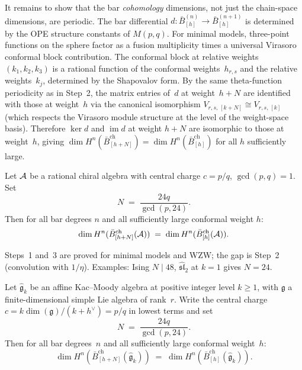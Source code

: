 \begin{evidence}
It remains to show that the bar \emph{cohomology} dimensions, not just the
chain-space dimensions, are periodic.  The bar differential
$d \colon \bar{B}^{(n)}_{[h]} \to \bar{B}^{(n+1)}_{[h]}$ is determined by the
OPE structure constants of $M(p,q)$.  For minimal models, three-point functions
on the sphere factor as a fusion multiplicity times a universal Virasoro
conformal block contribution.  The conformal block at relative weights
$(k_1, k_2, k_3)$ is a rational function of the conformal weights~$h_{r,s}$
and the relative weights~$k_j$, determined by the Shapovalov form.  By the
same theta-function periodicity as in Step~2, the matrix entries of~$d$ at
weight~$h+N$ are identified with those at weight~$h$ via the canonical
isomorphism $V_{r,s,\,[k+N]} \cong V_{r,s,\,[k]}$ (which respects the
Virasoro module structure at the level of the weight-space basis).  Therefore
$\ker d$ and $\operatorname{im} d$ at weight $h+N$ are isomorphic to those at
weight~$h$, giving
$\dim H^n(\bar{B}_{[h+N]}^{\mathrm{ch}}) = \dim H^n(\bar{B}_{[h]}^{\mathrm{ch}})$
for all $h$ sufficiently large.
\end{evidence}

\begin{conjecture}
\label{conj:modular-periodicity}
Let $\mathcal{A}$ be a rational chiral algebra with central charge $c = p/q$, $\gcd(p,q) = 1$.  Set
\[
N \;=\; \frac{24q}{\gcd(p,24)}.
\]
Then for all bar degrees $n$ and all sufficiently large conformal weight $h$:
\[
\dim H^n(\bar{B}_{[h+N]}^{\mathrm{ch}}(\mathcal{A}))
\;=\;
\dim H^n(\bar{B}_{[h]}^{\mathrm{ch}}(\mathcal{A})).
\]
\end{conjecture}

\begin{remark}\label{rem:modular-periodicity-scope}
Steps~1 and~3 are proved for minimal models and WZW; the gap is Step~2 (convolution with $1/\eta$).  Examples: Ising $N \mid 48$, $\widehat{\mathfrak{sl}}_2$ at $k=1$ gives $N=24$.
\end{remark}

\begin{conjecture}
\label{conj:modular-periodicity-wzw}
Let $\widehat{\mathfrak{g}}_k$ be an affine Kac--Moody algebra at
positive integer level $k \geq 1$, with $\mathfrak{g}$ a finite-dimensional
simple Lie algebra of rank~$r$.  Write the central charge
$c = k\dim(\mathfrak{g})/(k + h^\vee) = p/q$ in lowest terms and set
\[
N \;=\; \frac{24q}{\gcd(p,24)}.
\]
Then for all bar degrees~$n$ and all sufficiently large conformal
weight~$h$:
\[
\dim H^n(\bar{B}_{[h+N]}^{\mathrm{ch}}(\widehat{\mathfrak{g}}_k))
\;=\;
\dim H^n(\bar{B}_{[h]}^{\mathrm{ch}}(\widehat{\mathfrak{g}}_k)).
\]
\end{conjecture}

